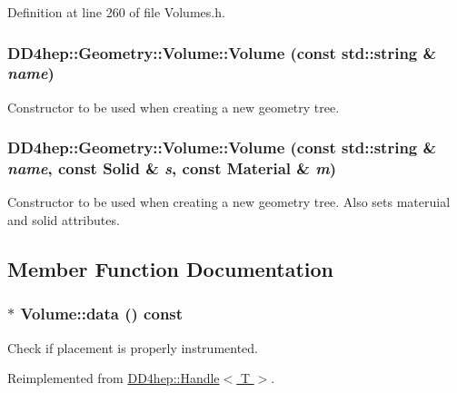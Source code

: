 Definition at line 260 of file Volumes.h.\hypertarget{class_d_d4hep_1_1_geometry_1_1_volume_adf459bc7a5cc8226ea4ca7d35c6f4eba}{
\subsubsection[{Volume}]{\setlength{\rightskip}{0pt plus 5cm}DD4hep::Geometry::Volume::Volume (const std::string \& {\em name})}}
\label{class_d_d4hep_1_1_geometry_1_1_volume_adf459bc7a5cc8226ea4ca7d35c6f4eba}


Constructor to be used when creating a new geometry tree. \hypertarget{class_d_d4hep_1_1_geometry_1_1_volume_ac235438382cd2da68de97bcf2eafae08}{
\subsubsection[{Volume}]{\setlength{\rightskip}{0pt plus 5cm}DD4hep::Geometry::Volume::Volume (const std::string \& {\em name}, \/  const {\bf Solid} \& {\em s}, \/  const {\bf Material} \& {\em m})}}
\label{class_d_d4hep_1_1_geometry_1_1_volume_ac235438382cd2da68de97bcf2eafae08}


Constructor to be used when creating a new geometry tree. Also sets materuial and solid attributes. 

\subsection{Member Function Documentation}
\hypertarget{class_d_d4hep_1_1_geometry_1_1_volume_aca15c04f667b12b142a300070c9b99ca}{
\subsubsection[{data}]{ $\ast$ Volume::data () const}}
\label{class_d_d4hep_1_1_geometry_1_1_volume_aca15c04f667b12b142a300070c9b99ca}


Check if placement is properly instrumented. 

Reimplemented from \hyperlink{class_d_d4hep_1_1_handle_a821fe41f46aa5ce97cfb04a6a60e5cd5}{DD4hep::Handle$<$ T $>$}.

